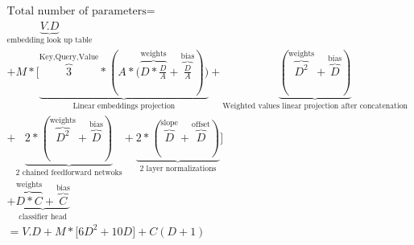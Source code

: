 \documentclass[a4paper]{article}
\begin{document}
\begin{equation}
\begin{aligned}
\text{Total number of parameters} =\\
\underbrace{V.D}_{\text{embedding look up table}} \\
+ M*\big[
\underbrace{\overbrace{3}^{\text{Key,Query,Value}} *
(A*\big(\overbrace{D*\frac{D}{A}}^{\text{weights}} + \overbrace{\frac{D}{A}}^{\text{bias}})\big)}_{\text{Linear embeddings projection}}
+ \underbrace{(\overbrace{D^2}^{\text{weights}} + \overbrace{D}^{\text{bias}})}_{\text{Weighted values linear projection after concatenation}} \\
+ \underbrace{2* (\overbrace{D^2}^{\text{weights}} + \overbrace{D}^{\text{bias}})}_{\text{2 chained feedforward netwoks}}
+ \underbrace{2*(\overbrace{D}^{\text{slope}}+\overbrace{D}^{\text{offset}})}_{\text{2 layer normalizations}}
    \big] \\
+ \underbrace{\overbrace{D*C}^{\text{weights}} + \overbrace{C}^{\text{bias}}}_{\text{classifier head}} \\
= V.D + M*\big[ 6D^2+ 10D\big] + C(D+1)
\end{aligned}
\end{equation}
\end{document}
